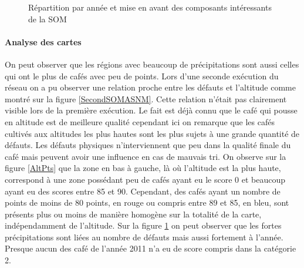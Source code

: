 \begin{figure}[H]
	\caption{\label{ThirdSOMASNM}Répartition par année et mise en avant des composants intéressants de la SOM}
	\centering
	\hfill
	\newline
	
	\centering
	\hfill
	\hfill
	\newline
	\centering 
\end{figure}

\newpage
\paragraph{Analyse des cartes}On peut observer que les régions avec beaucoup de précipitations sont aussi celles qui ont le plus de cafés avec peu de points. Lors d'une seconde exécution du réseau on a pu observer une relation proche entre les défauts et l'altitude comme montré sur la figure \ref{SecondSOMASNM}. Cette relation n'était pas clairement visible lors de la première exécution. Le fait est déjà connu que le café qui pousse en altitude est de meilleure qualité cependant ici on remarque que les cafés cultivés aux altitudes les plus hautes sont les plus sujets à une grande quantité de défauts. Les défauts physiques n'interviennent que peu dans la qualité finale du café mais peuvent avoir une influence en cas de mauvais tri. On observe sur la figure \ref{AltPts} que la zone en bas à gauche, là où l'altitude est la plus haute, correspond à une zone possédant peu de cafés ayant eu le score 0 et beaucoup ayant eu des scores entre 85 et 90. Cependant, des cafés ayant un nombre de points de moins de 80 points, en rouge ou compris entre 89 et 85, en bleu, sont présents plus ou moins de manière homogène sur la totalité de la carte, indépendamment de l'altitude. Sur la figure \ref{ThirdSOMASNM} on peut observer que les fortes précipitations sont liées au nombre de défauts mais aussi fortement à l'année. Presque aucun des café de l'année 2011 n'a eu de score compris dans la catégorie 2. 











